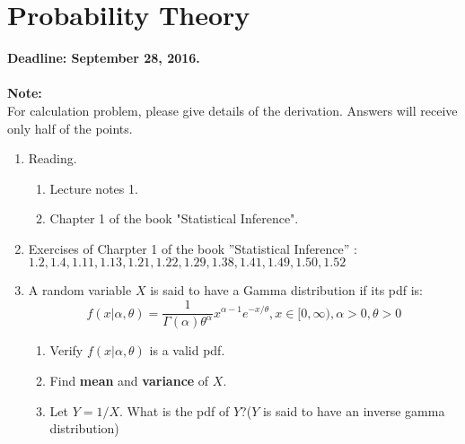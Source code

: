 \documentclass[12pt]{report}
\begin{document}
\chapter{Probability Theory}

\textcolor{MyRed}{
\textbf{
    \Large
    Deadline: September 28, 2016.
}
}\\\\
\textbf{Note:\\}For calculation problem, please give details of the derivation. Answers will receive only half of the points.



\begin{enumerate}

    \item Reading.
    \begin{enumerate}
        \item Lecture notes 1.
        \item Chapter 1 of the book "Statistical Inference".
    \end{enumerate}
    
    \item Exercises of Charpter 1 of the book ''Statistical Inference'' :\\
    $1.2,1.4,1.11,1.13,1.21,1.22,1.29,1.38,1.41,1.49,1.50,1.52$
     
     \item A random variable $X$ is said to have a Gamma distribution if its pdf is: \\
     $$f(x|\alpha,\theta)=\frac{1}{\Gamma(\alpha)\theta^\alpha}x^{\alpha-1}e^{-x/\theta},x \in [0,\infty), \alpha >0,\theta>0$$
      \begin{enumerate}
      \item Verify $f(x|\alpha,\theta)$ is a valid pdf.
      \item Find \textbf{mean} and \textbf{variance} of $X$.
      \item Let $Y=1/X$. What is the pdf of $Y$?($Y$ is said to have an inverse gamma distribution)
      \end{enumerate}
   
\end{enumerate}
\end{document}

